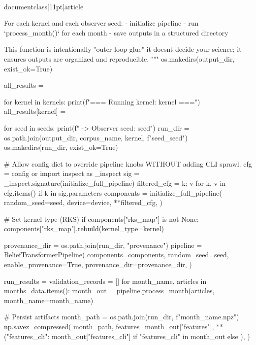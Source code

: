 \\documentclass[11pt]{article}
\begin{document}
\begin{CodeBlock}
    For each kernel and each observer seed:
      - initialize pipeline
      - run `process_month()` for each month
      - save outputs in a structured directory

    This function is intentionally "outer-loop glue"  it doesnt decide your science;
    it ensures outputs are organized and reproducible.
    """
    os.makedirs(output_dir, exist_ok=True)

    all_results = {}

    for kernel in kernels:
        print(f"\n=== Running kernel: {kernel} ===")
        all_results[kernel] = {}

        for seed in seeds:
            print(f"  -> Observer seed: {seed}")
            run_dir = os.path.join(output_dir, corpus_name, kernel, f"seed_{seed}")
            os.makedirs(run_dir, exist_ok=True)

            # Allow config dict to override pipeline knobs WITHOUT adding CLI sprawl.
            cfg = config or {}
            import inspect as _inspect
            sig = _inspect.signature(initialize_full_pipeline)
            filtered_cfg = {k: v for k, v in cfg.items() if k in sig.parameters}
            components = initialize_full_pipeline(
                random_seed=seed,
                device=device,
                **filtered_cfg,
            )

            # Set kernel type (RKS)
            if components["rks_map"] is not None:
                components["rks_map"].rebuild(kernel_type=kernel)

            provenance_dir = os.path.join(run_dir, "provenance")
            pipeline = BeliefTransformerPipeline(
                components=components,
                random_seed=seed,
                enable_provenance=True,
                provenance_dir=provenance_dir,
            )

            run_results = {}
            validation_records = []
            for month_name, articles in months_data.items():
                month_out = pipeline.process_month(articles, month_name=month_name)

                # Persist artifacts
                month_path = os.path.join(run_dir, f"{month_name}.npz")
                np.savez_compressed(
                    month_path,
                    features=month_out["features"],
                    **({"features_cli": month_out["features_cli"]} if "features_cli" in month_out else {}),
                )


\end{CodeBlock}
\end{document}
